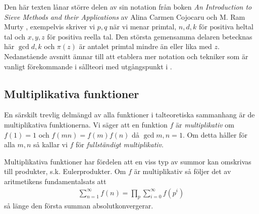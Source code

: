 
Den här texten lånar större delen av sin notation från boken \textit{An Introduction to Sieve Methods and their Applications} av Alina Carmen Cojocaru och M. Ram Murty \cite{cojocarumurty}, exempelvis skriver vi \(p, q\) när vi menar primtal, \(n, d, k\) för positiva heltal tal och \(x, y, z\) för positiva reella tal. Den största gemensamma delaren betecknas här \(\gcd{d, k}\) och \(\pi(z)\) är antalet primtal mindre än eller lika med \(z\). Nedanstående avsnitt ämnar till att etablera mer notation och tekniker som är vanligt förekommande i sållteori med utgångspunkt i \cite{cojocarumurty}.

\subsection{Multiplikativa funktioner} \label{mult}
En särskilt trevlig delmängd av alla funktioner i talteoretiska sammanhang är de multiplikativa funktionerna. Vi säger att en funktion $f$ är \textit{multiplikativ} om $f(1) = 1$ och \(f(mn) = f(m)f(n)\) då $\gcd{m,n} = 1$. Om detta håller för alla $m, n$ så kallar vi $f$ för \textit{fullständigt multiplikativ}. 

Multiplikativa funktioner har fördelen att en viss typ av summor kan omskrivas till produkter, s.k. Eulerprodukter. Om \(f\) är multiplikativ så följer det av aritmetikens fundamentalsats att
\begin{align*}
    \sum_{n = 1}^\infty f(n) = \prod_p \sum_{i=0}^\infty f(p^i)
\end{align*}
så länge den första summan absolutkonvergerar. 

